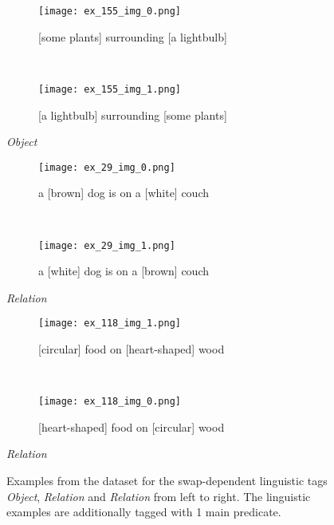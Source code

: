 \begin{figure}
\centering
    \begin{minipage}[t]{.30\textwidth}
        \begin{subfigure}[t]{\textwidth}
        \centering
        \texttt{[image: ex\_155\_img\_0.png]}
        \caption{[some plants] surrounding [a lightbulb]}
        \end{subfigure}\\
        \begin{subfigure}[t]{\textwidth}
        \centering
        \texttt{[image: ex\_155\_img\_1.png]}
        \caption{[a lightbulb] surrounding [some plants]}
        \end{subfigure}%
        \caption*{\textit{Object}}
    \end{minipage}
    \hfill
    \begin{minipage}[t]{.30\textwidth}
        \begin{subfigure}[t]{\textwidth}
        \centering
        \texttt{[image: ex\_29\_img\_0.png]}
        \caption{a [brown] dog is on a [white] couch}
        \end{subfigure}\\
        \vspace{9pt}
        \begin{subfigure}[t]{\textwidth}
        \centering
        \texttt{[image: ex\_29\_img\_1.png]}
        \caption{a [white] dog is on a [brown] couch}
        \end{subfigure}%
        \caption*{\textit{Relation}}
    \end{minipage}
    \hfill
    \begin{minipage}[t]{.30\textwidth}
        \begin{subfigure}[t]{\textwidth}
        \centering
        \texttt{[image: ex\_118\_img\_1.png]}
        \caption{[circular] food on [heart-shaped] wood}
        \end{subfigure}\\
        \begin{subfigure}[t]{\textwidth}
        \centering
        \texttt{[image: ex\_118\_img\_0.png]}
        \caption{[heart-shaped] food on [circular] wood}
        \end{subfigure}%
        \caption*{\textit{Relation}}
    \end{minipage}%
    \caption{Examples from the dataset for the swap-dependent linguistic tags \textit{Object}, \textit{Relation} and \textit{Relation} from left to right. The linguistic examples are additionally tagged with 1 main predicate.}
    \label{fig:dataset-examples}
\end{figure}


